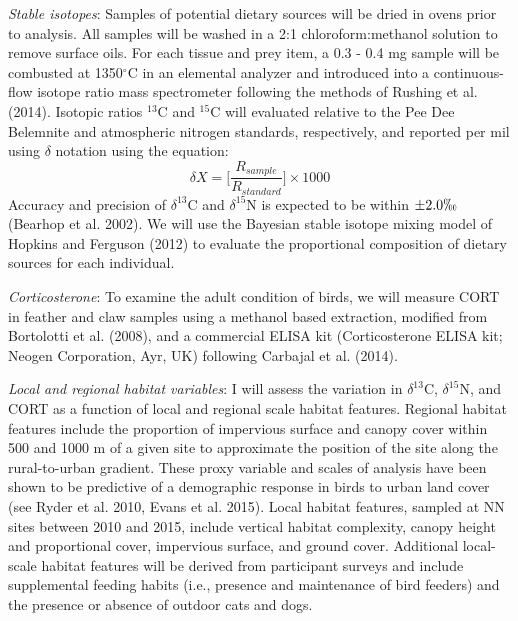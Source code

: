 \documentclass[12pt]{article}
\begin{document}
\noindent \textit{Stable isotopes}: Samples of potential dietary sources will be dried in ovens prior to analysis. All samples will be washed in a 2:1 chloroform:methanol solution to remove surface oils. For each tissue and prey item, a 0.3 - 0.4 mg sample will be combusted at 1350$^{\circ}$C in an elemental analyzer and introduced into a continuous-flow isotope ratio mass spectrometer following the methods of Rushing et al. (2014). Isotopic ratios $^{13}$C and $^{15}$C will evaluated relative to the Pee Dee Belemnite and atmospheric nitrogen standards, respectively, and reported per mil using $\delta$ notation using the equation: $$\delta{X} = \bigg[ \frac{R_{sample}}{R_{standard}} \bigg] \times 1000$$
\noindent Accuracy and precision of $\delta^{13}$C and   $\delta^{15}$N is expected to be within $\pm 2.0 \permil$ (Bearhop et al. 2002). We will use the Bayesian stable isotope mixing model  of Hopkins and Ferguson (2012) to evaluate the proportional composition of dietary sources for each individual. \par

\noindent \textit{Corticosterone}:  To examine the adult condition of birds, we will measure CORT in feather and claw samples using a methanol based extraction, modified from Bortolotti et al. (2008), and a commercial ELISA kit (Corticosterone ELISA kit; Neogen Corporation, Ayr, UK) following Carbajal et al. (2014). \par 

\noindent \textit{Local and regional habitat variables}: I will assess the variation in $\delta^{13}$C,  $\delta^{15}$N, and CORT as a function of local and regional scale habitat features. Regional habitat features include the proportion of impervious surface and canopy cover within 500 and 1000 m of a given site to approximate the position of the site along the rural-to-urban gradient. These proxy variable and scales of analysis have been shown to be predictive of a demographic response in birds to urban land cover (see Ryder et al. 2010, Evans et al. 2015). Local habitat features, sampled at NN sites between 2010 and 2015, include vertical habitat complexity, canopy height and proportional cover, impervious surface, and ground cover. Additional local-scale habitat features will be derived from participant surveys and include supplemental feeding habits (i.e., presence and maintenance of bird feeders) and the presence or absence of outdoor cats and dogs. \par
\end{document}
